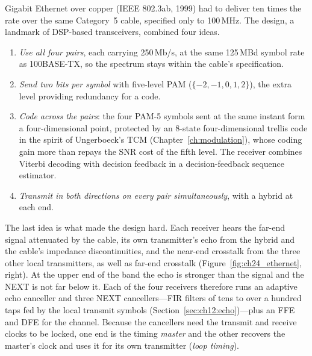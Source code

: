 Gigabit Ethernet over copper (IEEE 802.3ab, 1999) had to deliver ten times the rate over the same
Category~5 cable, specified only to 100\,MHz. The design, a landmark of DSP-based transceivers,
combined four ideas.
\begin{enumerate}
\item \emph{Use all four pairs}, each carrying 250\,Mb/s, at the same 125\,MBd symbol rate as
100BASE-TX, so the spectrum stays within the cable's specification.
\item \emph{Send two bits per symbol} with five-level PAM ($\{-2,-1,0,1,2\}$), the extra level
providing redundancy for a code.
\item \emph{Code across the pairs}: the four PAM-5 symbols sent at the same instant form a
four-dimensional point, protected by an 8-state four-dimensional trellis code in the spirit of
Ungerboeck's TCM (Chapter~\ref{ch:modulation}), whose coding gain more than repays the SNR cost of the
fifth level. The receiver combines Viterbi decoding with decision feedback in a decision-feedback
sequence estimator.
\item \emph{Transmit in both directions on every pair simultaneously}, with a hybrid at each end.
\end{enumerate}
The last idea is what made the design hard. Each receiver hears the far-end signal attenuated by the
cable, its own transmitter's echo from the hybrid and the cable's impedance discontinuities, and the
near-end crosstalk from the three other local transmitters, as well as far-end crosstalk
(Figure~\ref{fig:ch24_ethernet}, right). At the upper end of the band the echo is stronger than the signal
and the NEXT is not far below it. Each of the four receivers therefore runs an adaptive echo canceller and three NEXT
cancellers---FIR filters of tens to over a hundred taps fed by the local transmit symbols
(Section~\ref{sec:ch12:echo})---plus an FFE and DFE for the channel. Because the cancellers need the
transmit and receive clocks to be locked, one end is the timing \emph{master} and the other recovers
the master's clock and uses it for its own transmitter (\emph{loop timing}).


